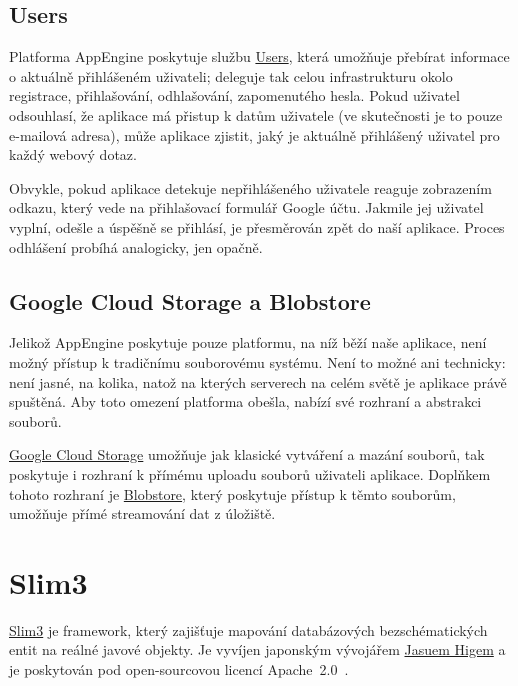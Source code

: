 \subsection{Users}

Platforma AppEngine poskytuje službu \href{https://developers.google.com/appengine/docs/java/users/}{Users}, která umožňuje přebírat informace o aktuálně přihlášeném uživateli; deleguje tak celou infrastrukturu okolo registrace, přihlašování, odhlašování, zapomenutého hesla.
Pokud uživatel odsouhlasí, že aplikace má přistup k datům uživatele (ve skutečnosti je to pouze e-mailová adresa), může aplikace zjistit, jaký je aktuálně přihlášený uživatel pro každý webový dotaz.

Obvykle, pokud aplikace detekuje nepřihlášeného uživatele reaguje zobrazením odkazu, který vede na přihlašovací formulář Google účtu.
Jakmile jej uživatel vyplní,  odešle a úspěšně se přihlásí, je přesměrován zpět do naší aplikace.
Proces odhlášení probíhá analogicky, jen opačně.


\subsection{Google Cloud Storage a Blobstore}

Jelikož AppEngine poskytuje pouze platformu, na níž běží naše aplikace, není možný přístup k tradičnímu souborovému systému.
Není to možné ani technicky: není jasné, na kolika, natož na kterých serverech na celém světě je aplikace právě spuštěná.
Aby toto omezení platforma obešla, nabízí své rozhraní a abstrakci souborů.

\href{https://developers.google.com/appengine/docs/java/googlecloudstorageclient/}{Google Cloud Storage} umožňuje jak klasické vytváření a mazání souborů, tak poskytuje i rozhraní k přímému uploadu souborů uživateli aplikace.
Doplňkem tohoto rozhraní je \href{https://developers.google.com/appengine/docs/java/blobstore/}{Blobstore}, který poskytuje přístup k těmto souborům, umožňuje přímé streamování dat z úložiště.

\section{Slim3}

\href{https://sites.google.com/site/slim3appengine/}{Slim3} je framework, který zajišťuje mapování databázových bezschématických entit na reálné javové objekty.
Je vyvíjen japonským vývojářem \href{mailto:higayasuo@gmail.com}{Jasuem Higem} a je poskytován pod open-sourcovou licencí Apache~2.0~\cite{apache20}.

